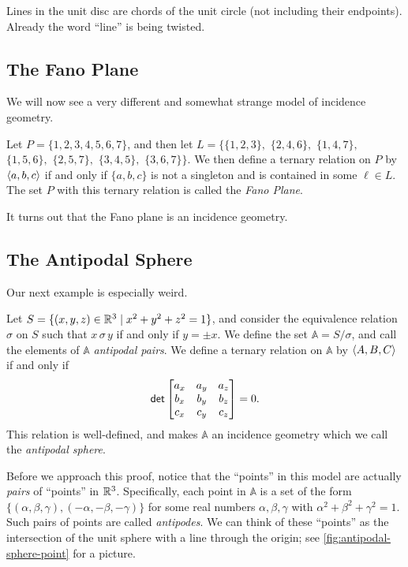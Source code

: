 Lines in the unit disc are chords of the unit circle (not including their endpoints).
Already the word ``line'' is being twisted.



\subsection{The Fano Plane}

We will now see a very different and somewhat strange model of incidence geometry.

\begin{dfn}
Let \(P = \{1,2,3,4,5,6,7\}\), and then let \(L = \{\{1,2,3\},\) \(\{2,4,6\},\) \(\{1,4,7\},\) \(\{1,5,6\},\) \(\{2,5,7\},\) \(\{3,4,5\},\) \(\{3,6,7\}\}\).
We then define a ternary relation on \(P\) by \(\langle a, b, c \rangle\) if and only if \(\{a,b,c\}\) is not a singleton and is contained in some \(\ell \in L\).
The set \(P\) with this ternary relation is called the \emph{Fano Plane}.
\end{dfn}

It turns out that the Fano plane is an incidence geometry.



\subsection{The Antipodal Sphere}

Our next example is especially weird.

\begin{prop}
Let \(S = \{ (x,y,z) \in \mathbb{R}^3 \mid x^2 + y^2 + z^2 = 1 \}\), and consider the equivalence relation \(\sigma\) on \(S\) such that \(x \,\sigma\, y\) if and only if \(y = \pm x\).
We define the set \(\mathbb{A} = S/\sigma\), and call the elements of \(\mathbb{A}\) \emph{antipodal pairs}.
We define a ternary relation on \(\mathbb{A}\) by \(\langle A, B, C \rangle\) if and only if \[ \mathsf{det} \begin{bmatrix} a_x & a_y & a_z \\ b_x & b_y & b_z \\ c_x & c_y & c_z \end{bmatrix} = 0. \] This relation is well-defined, and makes \(\mathbb{A}\) an incidence geometry which we call the \emph{antipodal sphere}.
\end{prop}

Before we approach this proof, notice that the ``points'' in this model are actually \emph{pairs} of ``points'' in \(\mathbb{R}^3\).
Specifically, each point in \(\mathbb{A}\) is a set of the form \( \{ (\alpha, \beta, \gamma), (-\alpha, -\beta, -\gamma) \} \) for some real numbers \(\alpha, \beta, \gamma\) with \(\alpha^2 + \beta^2 + \gamma^2 = 1\).
Such pairs of points are called \emph{antipodes}.
We can think of these ``points'' as the intersection of the unit sphere with a line through the origin; see \autoref{fig:antipodal-sphere-point} for a picture.

